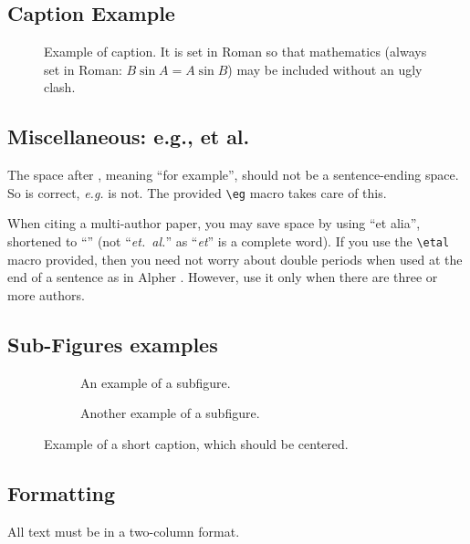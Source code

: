 \documentclass[10pt,twocolumn,letterpaper]{article}
\begin{document}
\subsection{Caption Example}
\begin{figure}[t]
  \centering
  \fbox{\rule{0pt}{2in} \rule{0.9\linewidth}{0pt}}

   \caption{Example of caption.
   It is set in Roman so that mathematics (always set in Roman: $B \sin A = A \sin B$) may be included without an ugly clash.}
   \label{fig:onecol}
\end{figure}
\subsection{Miscellaneous: e.g., et al.}
The space after \eg, meaning ``for example'', should not be a sentence-ending space.
So \eg is correct, {\em e.g.} is not.
The provided \verb'\eg' macro takes care of this.

When citing a multi-author paper, you may save space by using ``et alia'', shortened to ``\etal'' (not ``{\em et.\ al.}'' as ``{\em et}'' is a complete word).
If you use the \verb'\etal' macro provided, then you need not worry about double periods when used at the end of a sentence as in Alpher \etal.
However, use it only when there are three or more authors.
\subsection{Sub-Figures examples}
\begin{figure*}
  \centering
  \begin{subfigure}{0.68\linewidth}
    \fbox{\rule{0pt}{2in} \rule{.9\linewidth}{0pt}}
    \caption{An example of a subfigure.}
    \label{fig:short-a}
  \end{subfigure}
  \hfill
  \begin{subfigure}{0.28\linewidth}
    \fbox{\rule{0pt}{2in} \rule{.9\linewidth}{0pt}}
    \caption{Another example of a subfigure.}
    \label{fig:short-b}
  \end{subfigure}
  \caption{Example of a short caption, which should be centered.}
  \label{fig:short}
\end{figure*}
\subsection{Formatting}
All text must be in a two-column format.
\end{document}
